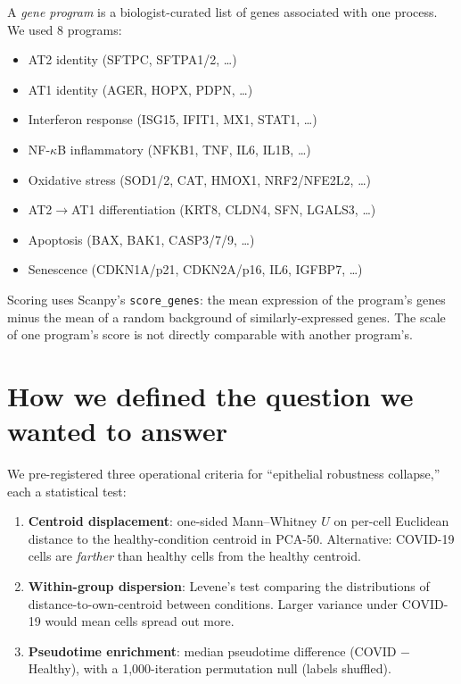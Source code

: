 \documentclass[11pt]{article}
\begin{document}
A \emph{gene program} is a biologist-curated list of genes associated with one process. We used 8 programs:

\begin{itemize}[leftmargin=1em,nosep]
\item AT2 identity (SFTPC, SFTPA1/2, \dots)
\item AT1 identity (AGER, HOPX, PDPN, \dots)
\item Interferon response (ISG15, IFIT1, MX1, STAT1, \dots)
\item NF-$\kappa$B inflammatory (NFKB1, TNF, IL6, IL1B, \dots)
\item Oxidative stress (SOD1/2, CAT, HMOX1, NRF2/NFE2L2, \dots)
\item AT2$\rightarrow$AT1 differentiation (KRT8, CLDN4, SFN, LGALS3, \dots)
\item Apoptosis (BAX, BAK1, CASP3/7/9, \dots)
\item Senescence (CDKN1A/p21, CDKN2A/p16, IL6, IGFBP7, \dots)
\end{itemize}

Scoring uses Scanpy's \texttt{score\_genes}: the mean expression of the program's genes minus the mean of a random background of similarly-expressed genes. \alert{The scale of one program's score is not directly comparable with another program's.}

\section{How we defined the question we wanted to answer}

We pre-registered three operational criteria for ``epithelial robustness collapse,'' each a statistical test:

\begin{enumerate}
\item \textbf{Centroid displacement}: one-sided Mann--Whitney $U$ on per-cell Euclidean distance to the healthy-condition centroid in PCA-50. Alternative: COVID-19 cells are \emph{farther} than healthy cells from the healthy centroid.
\item \textbf{Within-group dispersion}: Levene's test comparing the distributions of distance-to-own-centroid between conditions. Larger variance under COVID-19 would mean cells spread out more.
\item \textbf{Pseudotime enrichment}: median pseudotime difference (COVID $-$ Healthy), with a 1{,}000-iteration permutation null (labels shuffled).
\end{enumerate}
\end{document}
